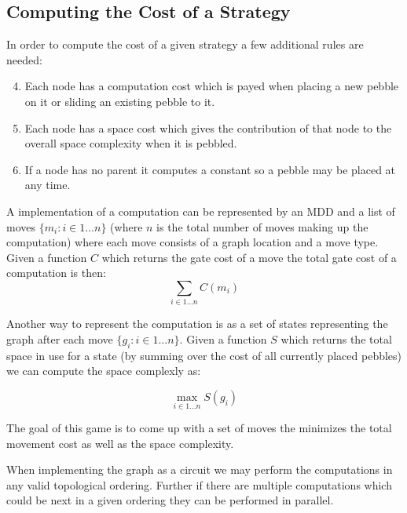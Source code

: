 


\subsection{Computing the Cost of a Strategy}

In order to compute the cost of a given strategy a few additional rules are
needed:

\begin{enumerate}
    \setcounter{enumi}{3}
  \item Each node has a computation cost which is payed when placing a new pebble on
    it or sliding an existing pebble to it.
  \item Each node has a space cost which gives the contribution of that node to
    the overall space complexity when it is pebbled.
  \item If a node has no parent it computes a constant so a pebble may be placed
    at any time.
\end{enumerate}

A implementation of a computation can be represented by an MDD and a list of
moves $\{m_i:i \in 1 \dotsc n\}$ (where $n$ is the total number of moves making up the
computation) where each move consists of a graph location and a move type. Given
a function $C$ which returns the gate cost of a move the total gate cost of a
computation is then:
\[ \sum_{i\in 1 \dotsc n} C(m_i) \]

Another way to represent the computation is as a set of states representing the
graph after each move $\{g_i:i \in 1 \dotsc n\}$. Given a function $S$ which
returns the total space in use for a state (by summing over the cost of all
currently placed pebbles) we can compute the space complexly as:

\[ \max_{i\in 1 \dotsc n} S(g_i) \]

The goal of this game is to come up with a set of moves the minimizes the total
movement cost as well as the space complexity.

When implementing the graph as a circuit we may perform the computations in any
valid topological ordering. Further if there are multiple computations which
could be next in a given ordering they can be performed in parallel.

